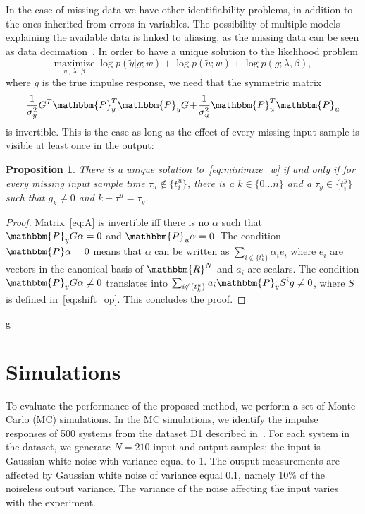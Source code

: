 \documentclass[10pt]{article}
\newcommand{\R}{\mathbbm{R}}
\renewcommand{\P}{\mathbbm{P}}
\newtheorem{proposition}{Proposition}
\begin{document}
In the case of missing data we have other identifiability problems, in
addition to the ones inherited from errors-in-variables. The possibility of
multiple models explaining the available data is linked to aliasing, as the
missing data can be seen as data decimation~\cite{wallin2002multiple}. In order
to have a unique solution to the likelihood problem
\begin{equation}\label{eq:minimize_w}
  \underset{w,\,\lambda,\,\beta}{\text{maximize}}\; \log p(\tilde y|g;w) + \log
  p(\tilde u;w) + \log p(g;\lambda,\beta), \end{equation} where $g$ is the true
  impulse response, we need that the symmetric matrix
  \begin{equation}\label{eq:A}
  \frac{1}{\sigma^2_y}G^T\P_y^T\P_y G\!+\!\frac{1}{\sigma_u^2} \P_u^T\P_u
\end{equation} is invertible. This is the case as long as the effect of every
missing input sample is visible at least once in the output:
\begin{proposition}\label{prop:identifiability}
  There is a unique solution to~\eqref{eq:minimize_w} if and
  only if for every missing input sample time $\tau_u \notin \{t^u_i\}$, there
  is a $k \in \{0\dots n\}$ and a $\tau_y \in \{t^y_i\}$ such that $g_k\neq 0$
  and $k+\tau^u = \tau_y$.  \end{proposition} \begin{proof} Matrix~\eqref{eq:A} is
  invertible iff there is no $\alpha$ such that $\P_y G \alpha=0$ and
  $\P_u\alpha=0$. The condition $\P\alpha =0$ means that $\alpha$ can be
  written as $\sum_{i\notin \{t^u_k\}} \alpha_i e_i$ where $e_i$ are vectors in
  the canonical basis of $\R^N$ and $a_i$ are scalars. The condition
  $\P_y G\alpha\neq 0$ translates into $\sum_{i\notin \{t^u_k\}} a_i \P_y S^i g
  \neq 0$, where $S$ is defined in~\eqref{eq:shift_op}. This concludes the
  proof.  \end{proof}
g
\section{Simulations}\label{sec:simulations}
To evaluate the performance of the proposed method, we perform a set of Monte
Carlo (MC) simulations. In the MC simulations, we identify the impulse
responses of 500 systems from the dataset D1 described in~\cite{chen2012sparse}.
For each system in the dataset, we generate $N  = 210$ input and output
samples; the input is Gaussian white noise with variance equal to 1. The output
measurements are affected by Gaussian white noise of variance equal 0.1, namely
10\% of the noiseless output variance. The variance of the noise affecting the
input varies with the experiment.
\end{document}
